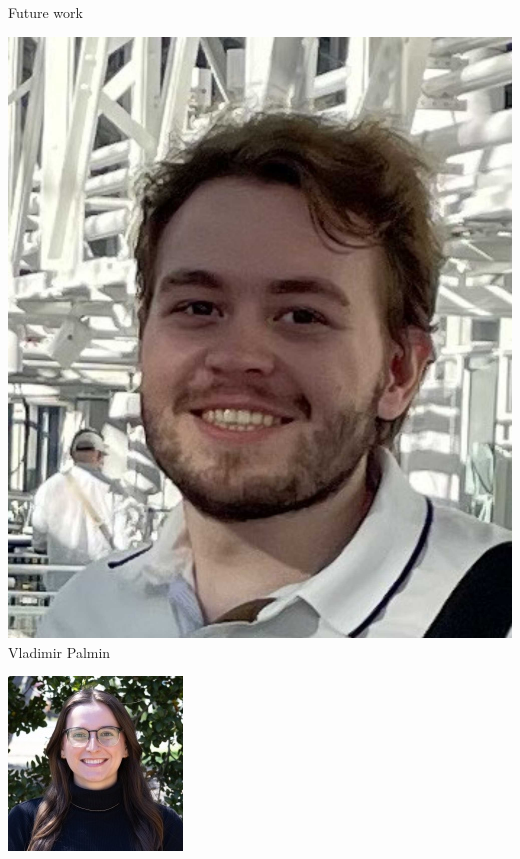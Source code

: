 \begin{frame}{Future work}
{
    \centering
\begin{minipage}[t]{0.24\textwidth}
    \centering
    \includegraphics[height=0.9\textwidth]{static_figures/vladimir_palmin.jpg}\\
    Vladimir Palmin
\end{minipage}
\begin{minipage}[t]{0.24\textwidth}
    \centering
    \includegraphics[height=0.9\textwidth]{static_figures/sequoia.jpg}\\

\end{minipage}}
\end{frame}

